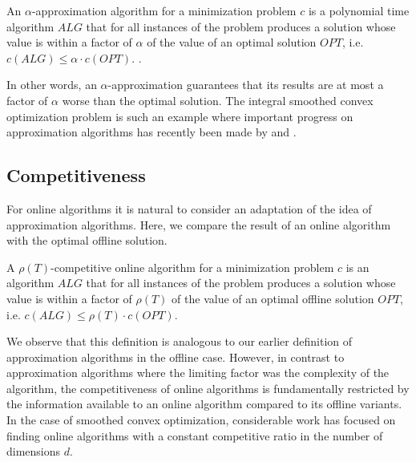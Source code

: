 \begin{definition}
An $\alpha$-approximation algorithm for a minimization problem $c$ is a polynomial time algorithm $ALG$ that for all instances of the problem produces a solution whose value is within a factor of $\alpha$ of the value of an optimal solution $OPT$, i.e. $c(ALG) \leq \alpha \cdot c(OPT)$. \cite{Williamson2011}.
\end{definition}

In other words, an $\alpha$-approximation guarantees that its results are at most a factor of $\alpha$ worse than the optimal solution. The integral smoothed convex optimization problem is such an example where important progress on approximation algorithms has recently been made by \citeauthor*{Kappelmann2017} and \citeauthor*{Albers2021_2} \cite{Kappelmann2017, Albers2021_2}.

\subsection{Competitiveness}

For online algorithms it is natural to consider an adaptation of the idea of approximation algorithms. Here, we compare the result of an online algorithm with the optimal offline solution.

\begin{definition}
A $\rho(T)$-competitive online algorithm for a minimization problem $c$ is an algorithm $ALG$ that for all instances of the problem produces a solution whose value is within a factor of $\rho(T)$ of the value of an optimal offline solution $OPT$, i.e. $c(ALG) \leq \rho(T) \cdot c(OPT)$.
\end{definition}

We observe that this definition is analogous to our earlier definition of approximation algorithms in the offline case. However, in contrast to approximation algorithms where the limiting factor was the complexity of the algorithm, the competitiveness of online algorithms is fundamentally restricted by the information available to an online algorithm compared to its offline variants. In the case of smoothed convex optimization, considerable work has focused on finding online algorithms with a constant competitive ratio in the number of dimensions $d$.

